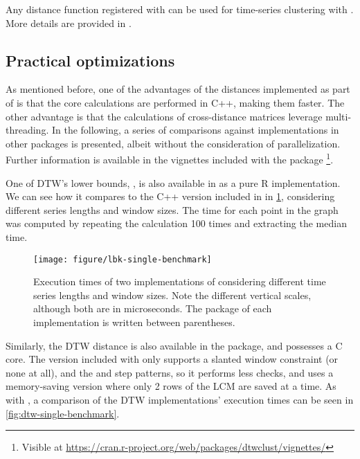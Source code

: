 Any distance function registered with  can be used for time-series clustering with \dtwclust{}.
More details are provided in .

\subsection{Practical optimizations}
\label{sec:minibench}

As mentioned before,
one of the advantages of the distances implemented as part of \dtwclust{} is that the core calculations are performed in C++,
making them faster.
The other advantage is that the calculations of cross-distance matrices leverage multi-threading.
In the following,
a series of comparisons against implementations in other packages is presented,
albeit without the consideration of parallelization.
Further information is available in the vignettes included with the package%
\footnote{Visible at \url{https://cran.r-project.org/web/packages/dtwclust/vignettes/}}.

One of DTW's lower bounds,
,
is also available in  as a pure R implementation.
We can see how it compares to the C++ version included in \dtwclust{} in \cref{fig:lbk-single-benchmark},
considering different series lengths and window sizes.
The time for each point in the graph was computed by repeating the calculation 100 times and extracting the median time.

\begin{figure}[htbp]

	{\centering \texttt{[image: figure/lbk-single-benchmark]}

	}

	\caption{Execution times of two implementations of  considering different time series lengths and window sizes. Note the different vertical scales, although both are in microseconds. The package of each implementation is written between parentheses.}\label{fig:lbk-single-benchmark}
\end{figure}

Similarly, the DTW distance is also available in the  package,
and possesses a C core.
The  version included with \dtwclust{} only supports a slanted window constraint
(or none at all),
and the  and  step patterns,
so it performs less checks,
and uses a memory-saving version where only 2 rows of the LCM are saved at a time.
As with ,
a comparison of the DTW implementations' execution times can be seen in \cref{fig:dtw-single-benchmark}.

